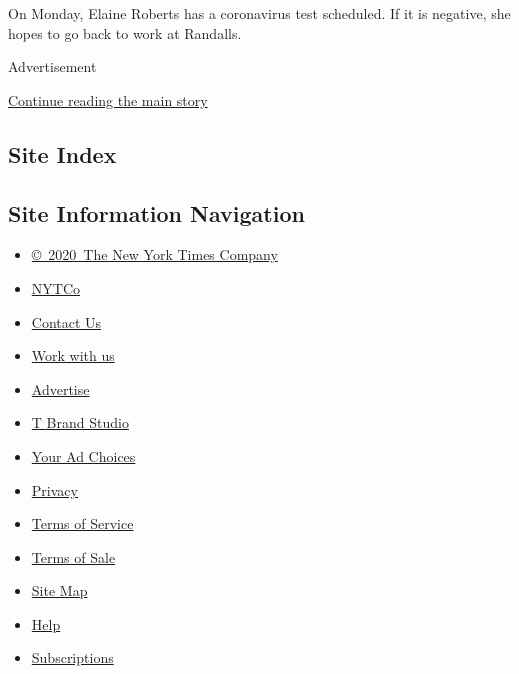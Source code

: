 On Monday, Elaine Roberts has a coronavirus test scheduled. If it is
negative, she hopes to go back to work at Randalls.

Advertisement

\protect\hyperlink{after-bottom}{Continue reading the main story}

\hypertarget{site-index}{%
\subsection{Site Index}\label{site-index}}

\hypertarget{site-information-navigation}{%
\subsection{Site Information
Navigation}\label{site-information-navigation}}

\begin{itemize}
\tightlist
\item
  \href{https://help.nytimes.com/hc/en-us/articles/115014792127-Copyright-notice}{©~2020~The
  New York Times Company}
\end{itemize}

\begin{itemize}
\tightlist
\item
  \href{https://www.nytco.com/}{NYTCo}
\item
  \href{https://help.nytimes.com/hc/en-us/articles/115015385887-Contact-Us}{Contact
  Us}
\item
  \href{https://www.nytco.com/careers/}{Work with us}
\item
  \href{https://nytmediakit.com/}{Advertise}
\item
  \href{http://www.tbrandstudio.com/}{T Brand Studio}
\item
  \href{https://www.nytimes.com/privacy/cookie-policy\#how-do-i-manage-trackers}{Your
  Ad Choices}
\item
  \href{https://www.nytimes.com/privacy}{Privacy}
\item
  \href{https://help.nytimes.com/hc/en-us/articles/115014893428-Terms-of-service}{Terms
  of Service}
\item
  \href{https://help.nytimes.com/hc/en-us/articles/115014893968-Terms-of-sale}{Terms
  of Sale}
\item
  \href{https://spiderbites.nytimes.com}{Site Map}
\item
  \href{https://help.nytimes.com/hc/en-us}{Help}
\item
  \href{https://www.nytimes.com/subscription?campaignId=37WXW}{Subscriptions}
\end{itemize}
